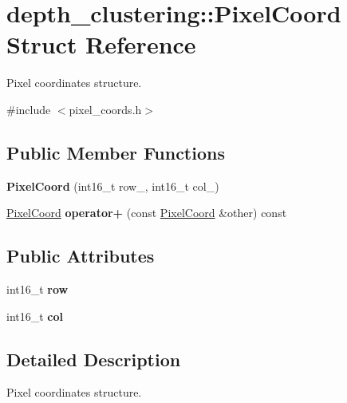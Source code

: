 \hypertarget{structdepth__clustering_1_1PixelCoord}{}\section{depth\+\_\+clustering\+:\+:Pixel\+Coord Struct Reference}
\label{structdepth__clustering_1_1PixelCoord}


Pixel coordinates structure.  




{\ttfamily \#include $<$pixel\+\_\+coords.\+h$>$}

\subsection*{Public Member Functions}
\begin{DoxyCompactItemize}
\item 
\mbox{\label{structdepth__clustering_1_1PixelCoord_aff0f4516ef80598fce8f8fc7a2206ac4}} 
{\bfseries Pixel\+Coord} (int16\+\_\+t row\+\_\+, int16\+\_\+t col\+\_\+)
\item 
\mbox{\label{structdepth__clustering_1_1PixelCoord_ace0ab686be5bf732d384b5b28c57f16a}} 
\hyperlink{structdepth__clustering_1_1PixelCoord}{Pixel\+Coord} {\bfseries operator+} (const \hyperlink{structdepth__clustering_1_1PixelCoord}{Pixel\+Coord} \&other) const
\end{DoxyCompactItemize}
\subsection*{Public Attributes}
\begin{DoxyCompactItemize}
\item 
\mbox{\label{structdepth__clustering_1_1PixelCoord_ac612119e738debf6a06ded94f3c7daba}} 
int16\+\_\+t {\bfseries row}
\item 
\mbox{\label{structdepth__clustering_1_1PixelCoord_ab4311a0fa6c6d0f538ef751e6134498f}} 
int16\+\_\+t {\bfseries col}
\end{DoxyCompactItemize}


\subsection{Detailed Description}
Pixel coordinates structure. 

